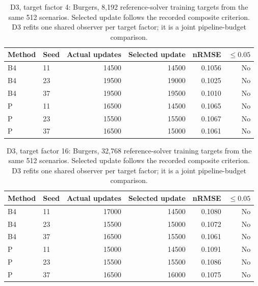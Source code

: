 \begin{table}[!ht]
\centering\small
\caption{D3, target factor 4: Burgers, 8,192 reference-solver training targets from the same 512 scenarios. Selected update follows the recorded composite criterion. D3 refits one shared observer per target factor; it is a joint pipeline-budget comparison.}\label{tab:scaling_E3_4}
\begin{tabular}{@{}llrrrr@{}}\toprule
Method & Seed & Actual updates & Selected update & nRMSE & $\leq0.05$\\\midrule
B4 & 11 & 14500 & 14500 & 0.1056 & No\\
B4 & 23 & 19500 & 19000 & 0.1025 & No\\
B4 & 37 & 19500 & 19500 & 0.1010 & No\\
P & 11 & 16500 & 14500 & 0.1065 & No\\
P & 23 & 15500 & 15500 & 0.1067 & No\\
P & 37 & 16500 & 15000 & 0.1061 & No\\
\bottomrule\end{tabular}
\end{table}

\begin{table}[!ht]
\centering\small
\caption{D3, target factor 16: Burgers, 32,768 reference-solver training targets from the same 512 scenarios. Selected update follows the recorded composite criterion. D3 refits one shared observer per target factor; it is a joint pipeline-budget comparison.}\label{tab:scaling_E3_16}
\begin{tabular}{@{}llrrrr@{}}\toprule
Method & Seed & Actual updates & Selected update & nRMSE & $\leq0.05$\\\midrule
B4 & 11 & 17000 & 14500 & 0.1080 & No\\
B4 & 23 & 15500 & 15000 & 0.1072 & No\\
B4 & 37 & 16500 & 15500 & 0.1061 & No\\
P & 11 & 15000 & 14500 & 0.1091 & No\\
P & 23 & 15500 & 15500 & 0.1086 & No\\
P & 37 & 16500 & 16000 & 0.1075 & No\\
\bottomrule\end{tabular}
\end{table}

